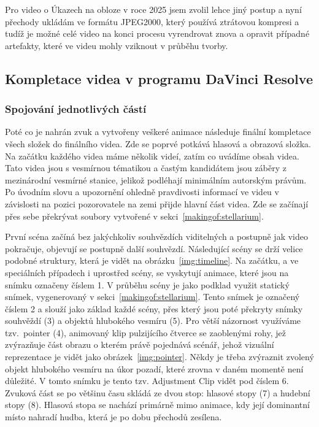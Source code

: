 \documentclass[12pt,a4paper,titlepage]{article}
\begin{document}
Pro video o Úkazech na obloze v roce 2025 jsem zvolil lehce jiný postup a nyní přechody ukládám ve formátu JPEG2000, který používá ztrátovou kompresi a tudíž je možné celé video na konci procesu vyrendrovat znova a opravit případné artefakty, které ve videu mohly vziknout v průběhu tvorby.
\subsection{Kompletace videa v programu DaVinci Resolve}\label{makingof:resolve}
\subsubsection{Spojování jednotlivých částí}\label{makingof:resolve:merging}
Poté co je nahrán zvuk a vytvořeny veškeré animace následuje finální kompletace všech složek do finálního videa. Zde se poprvé potkává hlasová a obrazová složka. Na začátku každého videa máme několik videí, zatím co uvádíme obsah videa. Tato videa jsou s vesmírnou tématikou a častým kandidátem jsou záběry z mezinárodní vesmírné stanice, jelikož podléhají minimálním autorským právům. Po úvodním slovu a upozornění ohledně pravdivosti informací ve videu v závislosti na pozici pozorovatele na zemi přijde hlavní část videa. Zde se začínají přes sebe překrývat soubory vytvořené v sekci~\ref{makingof:stellarium}.

První scéna začíná bez jakýchkoliv souhvězdích viditelných a postupně jak video pokračuje, objevují se postupně další souhvězdí. Následující scény se drží velice podobné struktury, která je vidět na obrázku~\ref{img:timeline}. Na začátku, a ve speciálních případech i uprostřed scény, se vyskytují animace, které jsou na snímku označeny číslem 1. V průběhu scény je jako podklad využit statický snímek, vygenerovaný v sekci~\ref{makingof:stellarium}. Tento snímek je označený číslem 2 a slouží jako základ každé scény, přes který jsou poté překryty snímky souhvěždí (3) a objektů hlubokého vesmíru (5). Pro větší názornost využíváme tzv.\ pointer (4), animovaný klip pulzijícího čtverce se zaoblenými rohy, jež zvýrazňuje část obrazu o kterém právě pojednává scénář, jehož vizuální reprezentace je vidět jako obrázek~\ref{img:pointer}. Někdy je třeba zvýraznit zvolený objekt hlubokého vesmíru na úkor pozadí, které zrovna v daném momentě není důležité. V tomto snímku je tento tzv. Adjustment Clip vidět pod číslem 6. Zvuková část se po většinu času skládá ze dvou stop: hlasové stopy (7) a hudební stopy (8). Hlasová stopa se nachází primárně mimo animace, kdy její dominantní místo nahradí hudba, která je po dobu přechodů zesílena.
\end{document}
